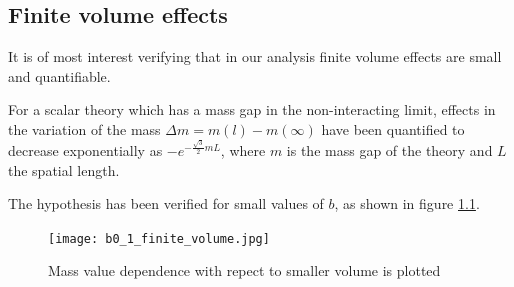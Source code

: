 \documentclass[12pt,a4paper]{report}
\begin{document}
\begin{appendices}
\chapter{Finite volume effects}

It is of most interest verifying that in our analysis finite volume effects are small and quantifiable.

For a scalar theory which has a mass gap in the non-interacting limit, effects in the variation of the mass $\Delta m = m(l)- m(\infty)$ have been quantified to decrease exponentially as $-e^{- \frac{\sqrt{3}}{2} m L } $, where $m$ is the mass gap of the theory and $L$ the spatial length\cite{luscher1986volume}.

The hypothesis has been verified for small values of $b$, as shown in figure \ref{fig:b0.1_finite_volume}.

\begin{figure}
\centering
\texttt{[image: b0\_1\_finite\_volume.jpg]}
\caption{Mass value dependence with repect to smaller volume is plotted}
\label{fig:b0.1_finite_volume}
\end{figure}



\end{appendices}

 

\end{document}
